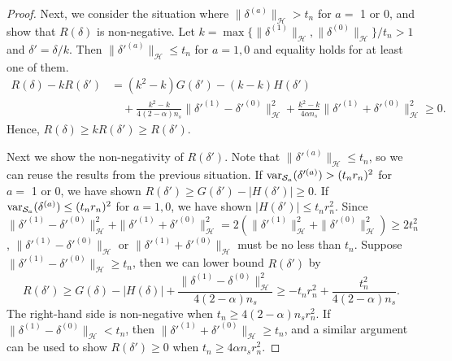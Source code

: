 \documentclass[12pt]{article}
\newcommand{\var}{\textnormal{var}}
\begin{document}
\begin{proof}
	
	Next, we consider the situation where $\| \delta^{(a)} \|_\mathcal{H} > t_n$ for $a = $ 1 or 0, and show that $R(\delta)$ is non-negative. Let $k = \max\{\| \delta^{(1)} \|_\mathcal{H}, \| \delta^{(0)} \|_\mathcal{H}\} / t_n > 1$ and $\delta' = \delta / k$. Then $\| \delta'^{(a)} \|_\mathcal{H} \le t_n$ for $a=1, 0$ and equality holds for at least one of them. 
	\begin{align*}
		R(\delta) - k R(\delta')
		&= (k^2 - k) G(\delta') - (k - k) H(\delta') 
		\\&\quad+
		\frac{k^2-k}{4(2-\alpha)n_s} \| \delta'^{(1)} - \delta'^{(0)} \|_\mathcal{H}^2 +
		\frac{k^2-k}{4 \alpha n_s} \| \delta'^{(1)} + \delta'^{(0)} \|_\mathcal{H}^2
		\ge 0
		.\end{align*}
	Hence, $R(\delta) \ge k R(\delta') \ge R(\delta')$. 
	
	Next we show the non-negativity of $R(\delta')$. Note that $\| \delta'^{(a)} \|_\mathcal{H} \le t_n$, so we can reuse the results from the previous situation. 
	If $\var_{\mathcal{S}_a}(\delta'^{(a)}) > (t_n r_n)^2$ for $a=$ 1 or 0, we have shown $R(\delta') \ge G(\delta') - |H(\delta')| \ge 0$. 
	If $\var_{\mathcal{S}_a}(\delta^{(a)}) \le (t_n r_n)^2$ for $a = 1, 0$, we have shown $|H(\delta')| \le t_n r_n^2$. Since $\| \delta'^{(1)} - \delta'^{(0)} \|_\mathcal{H}^2 + \| \delta'^{(1)} + \delta'^{(0)} \|_\mathcal{H}^2 = 2(\| \delta'^{(1)} \|_\mathcal{H}^2 + \| \delta'^{(0)} \|_\mathcal{H}^2) \ge 2 t_n^2$, $\| \delta'^{(1)} - \delta'^{(0)} \|_\mathcal{H}$ or $\| \delta'^{(1)} + \delta'^{(0)} \|_\mathcal{H}$ must be no less than $t_n$. Suppose $\| \delta'^{(1)} - \delta'^{(0)} \|_\mathcal{H} \ge t_n$, then we can lower bound $R(\delta')$ by
	\begin{equation*}
		R(\delta') \ge 
		G(\delta) - |H(\delta)| + 
		\frac{\| \delta^{(1)} - \delta^{(0)} \|_\mathcal{H}^2 }{4 (2-\alpha) n_s} \ge
		- t_n r_n^2 + 
		\frac{t_n^2 }{4 (2-\alpha) n_s}
		.\end{equation*}
	The right-hand side is non-negative when $t_n \ge 4(2-\alpha)n_s r_n^2$. If $\| \delta^{(1)} - \delta^{(0)} \|_\mathcal{H} < t_n$, then $\| \delta'^{(1)} + \delta'^{(0)} \|_\mathcal{H} \ge t_n$, and a similar argument can be used to show $R(\delta') \ge 0$ when $t_n \ge 4 \alpha n_s r_n^2$.
	

\end{proof}
\end{document}
